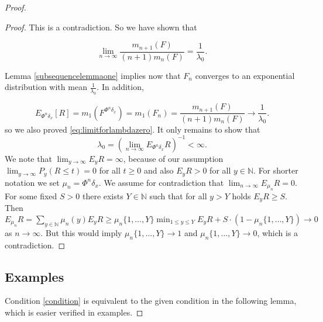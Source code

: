 \documentclass[12pt,a4paper]{scrartcl}
\numberwithin{equation}{section}
\newcommand{\N}{\mathbb{N}} %
\begin{document}
\begin{proof}
\begin{proof}
This is a contradiction. So we have shown that

$$\lim_{n \to \infty} \frac{m_{n+1}\left(F\right)}{\left(n+1\right) m_n\left(F\right)} = \frac{1}{\lambda_0}.$$

Lemma \ref{subsequencelemmaone} implies now that $ F_n $ converges to an exponential distribution with mean $ \frac{1}{\lambda_0} $. In addition,

$$ E_{\Phi^n\delta_x}\left[R\right] = m_1\left(F^{\Phi^n\delta_x}\right) = m_1\left(F_n\right) = \frac{m_{n+1}\left(F\right)}{\left(n+1\right) m_n\left(F\right)} \to \frac{1}{\lambda_0} .$$
so we also proved \eqref{eq:limitforlambdazero}.
It only remains to show that $$\lambda_0 = \left(\lim_{n \to \infty} E_{\Phi^n\delta_x}R\right)^{-1} < \infty.$$
We note that $ \lim_{y \to \infty} E_y R = \infty $, because of our assumption $ \lim_{y \to \infty} P_y\left(R \leq t\right) = 0$ for all $t \geq 0$ and also $E_y R >0$ for all $y \in \N$. For shorter notation we set $\mu_n = \Phi^n \delta_x $. 
We assume for contradiction that $ \lim_{n \to \infty} E_{\mu_n} R = 0 $. For some fixed $ S > 0 $ there exists $Y \in \N$ such that for all $ y > Y $ holds $ E_y R \geq S $. Then $ E_{\mu_n} R = \sum_{y \in \N} \mu_n\left(y\right) E_y R \geq \mu_n\lbrace 1,\ldots,Y\rbrace  \min_{1 \leq y \leq Y} E_y R + S \cdot \left(1 - \mu_n\lbrace 1,\ldots,Y\rbrace  \right) \to 0$ as $n \to \infty$. But this would imply $ \mu_n\lbrace 1,\ldots,Y\rbrace  \to 1 $ and $ \mu_n\lbrace 1,\ldots,Y\rbrace  \to 0 $, which is a contradiction.


\end{proof}

\subsection{Examples}

Condition \eqref{condition} is equivalent to the given condition in the following lemma, which is easier verified in examples.


\end{proof}
\end{document}
